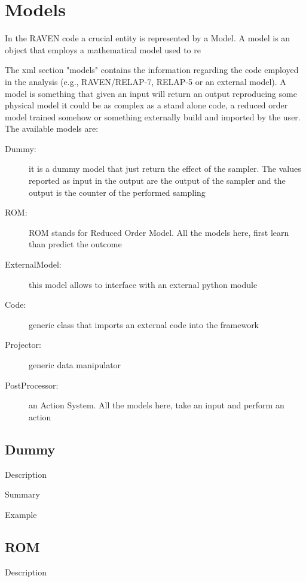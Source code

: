 \section{Models  \\ \vspace{2 mm} {\small }}
\label{sec:models}
In the RAVEN code a crucial entity is represented by a Model. A model is an object that employs a mathematical model used to re

The xml section "models" contains the information regarding the code employed in the analysis (e.g., RAVEN/RELAP-7, RELAP-5 or an external model). A model is something that given an input will return an output reproducing some physical model it could be as complex as a stand alone code, a reduced order model trained somehow or something externally build and imported by the user.
The available models are:
\begin{description}
\item [Dummy:] it is a dummy model that just return the effect of the sampler. The values reported as input in the output are the output of the sampler and the output is the counter of the performed sampling
\item [ROM:] ROM stands for Reduced Order Model. All the models here, first learn than predict the outcome
\item [ExternalModel:] this model allows to interface with an external python module
\item [Code:] generic class that imports an external code into the framework
\item [Projector:] generic data manipulator
\item [PostProcessor:] an Action System. All the models here, take an input and perform an action
\end{description}

\subsection{Dummy}
\label{sec:models_dummy}

Description

Summary

Example

\subsection{ROM}
\label{subsec:models_ROM}

Description

